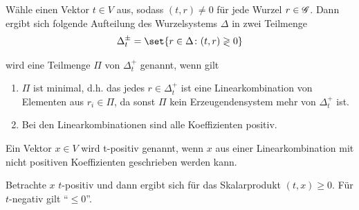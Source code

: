 Wähle einen Vektor $t \in V$ aus, sodass $(t,r) \neq 0$ für jede Wurzel $r \in \mathscr G$. Dann ergibt sich folgende Aufteilung des Wurzelsystems $\Delta$ in zwei Teilmenge
\begin{align*}
	\Delta_t^{\pm} = \set{r \in \Delta \colon (t,r) \gtrless 0}
\end{align*}
\begin{*definition}
	 wird eine Teilmenge $\Pi$ von $\Delta_t^+$ genannt, wenn gilt
	\begin{enumerate}
		\item $\Pi$ ist minimal, d.h. das jedes $r \in \Delta_t^+$ ist eine Linearkombination von Elementen aus $r_i \in \Pi$, da sonst $\Pi$ kein Erzeugendensystem mehr von $\Delta_t^+$ ist.
		\item Bei den Linearkombinationen sind alle Koeffizienten positiv. 
	\end{enumerate}
\end{*definition}
\begin{*definition}
	Ein Vektor $x \in V$ wird t-positiv genannt, wenn $x$ aus einer Linearkombination mit nicht positiven Koeffizienten geschrieben werden kann.
\end{*definition}
Betrachte $x$ $t$-positiv und dann ergibt sich für das Skalarprodukt $(t,x) \ge 0$. Für $t$-negativ gilt ``$\le 0$''.

